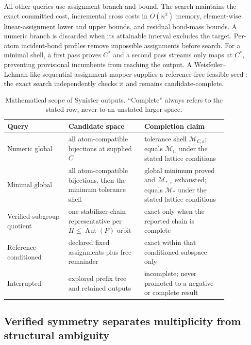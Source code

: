 \documentclass[11pt]{article}
\newcommand{\Aut}{\operatorname{Aut}}
\begin{document}
All other queries use assignment branch-and-bound.  The search maintains the
exact committed cost, incremental cross costs in $O(n^2)$ memory, element-wise
linear-assignment lower and upper bounds, and residual bond-mass bounds.  A
numeric branch is discarded when its attainable interval excludes the target.
Per-atom incident-bond profiles remove impossible assignments before search.
For a minimal shell, a first pass proves $C^*$ and a second pass streams only
maps at $C^*$, preventing provisional incumbents from reaching the output.
A Weisfeiler--Lehman-like sequential assignment mapper supplies a
reference-free feasible seed \citep{koda2025slapmapper}; the exact search
independently checks it and remains candidate-complete.

\begin{table}[t]
\centering
\caption{Mathematical scope of Synister outputs.  ``Complete'' always refers
to the stated row, never to an unstated larger space.}
\label{tab:scope}
\begin{tabular}{>{\raggedright\arraybackslash}p{0.25\linewidth}
                >{\raggedright\arraybackslash}p{0.31\linewidth}
                >{\raggedright\arraybackslash}p{0.34\linewidth}}
\toprule
Query & Candidate space & Completion claim \\
\midrule
Numeric global & all atom-compatible bijections at supplied $C$ & tolerance
shell $\mathcal M_{C,\varepsilon}$; equals $\mathcal M_C$ under the stated
lattice conditions \\
Minimal global & all atom-compatible bijections, then the minimum tolerance
shell & global minimum proved and $\mathcal M_{*,\varepsilon}$ exhausted;
equals $\mathcal M_*$ under the stated lattice conditions \\
Verified subgroup quotient & one stabilizer-chain representative per
$H\leq\Aut(P)$ orbit & exact only when the reported chain is complete \\
Reference-conditioned & declared fixed assignments plus free remainder &
exact within that conditioned subspace only \\
Interrupted & explored prefix tree and retained outputs & incomplete; never
promoted to a negative or complete result \\
\bottomrule
\end{tabular}
\end{table}

\subsection*{Verified symmetry separates multiplicity from structural
ambiguity}
\end{document}
